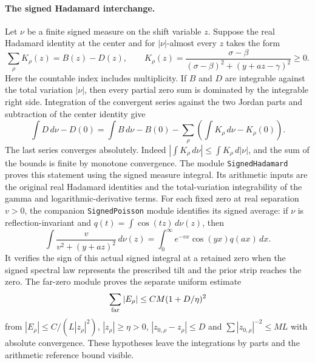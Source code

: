 \paragraph{The signed Hadamard interchange.}
Let $\nu$ be a finite signed measure on the shift variable $z$.
Suppose the real Hadamard identity at the center and for
$|\nu|$-almost every $z$ takes the form
\[
 \sum_{\rho}K_\rho(z)=B(z)-D(z),\qquad
 K_\rho(z)=\frac{\sigma-\beta}
 {(\sigma-\beta)^2+(y+az-\gamma)^2}\ge0.
\]
Here the countable index includes multiplicity. If $B$ and $D$ are
integrable against the total variation $|\nu|$, then every partial
zero sum is dominated by the integrable right side. Integration of
the convergent series against the two Jordan parts and subtraction
of the center identity give
\[
 \int D\,d\nu-D(0)
  = \int B\,d\nu-B(0)
      -\sum_\rho\left(\int K_\rho\,d\nu-K_\rho(0)\right).
\]
The last series converges absolutely. Indeed
$|\int K_\rho\,d\nu|\le\int K_\rho\,d|\nu|$, and the sum of the
bounds is finite by monotone convergence. The module
\texttt{SignedHadamard} proves this statement using the signed
measure integral. Its arithmetic inputs are the original real
Hadamard identities and the total-variation integrability of the
gamma and logarithmic-derivative terms.
For each fixed zero at real separation $v>0$, the companion
\texttt{SignedPoisson} module identifies its signed average:
if $\nu$ is reflection-invariant and
$q(t)=\int\cos(tz)\,d\nu(z)$, then
\[
 \int \frac{v}{v^2+(y+az)^2}\,d\nu(z)
  =\int_0^\infty e^{-vx}\cos(yx)q(ax)\,dx.
\]
It verifies the sign of this actual signed integral at a retained zero
when the signed spectral law represents the prescribed tilt and the
prior strip reaches the zero. The far-zero module proves the separate
uniform estimate
\[
 \sum_{\rm far}|E_\rho|\le CM(1+D/\eta)^2
\]
from $|E_\rho|\le C/(L|z_\rho|^2)$, $|z_\rho|\ge\eta>0$,
$|z_{0,\rho}-z_\rho|\le D$ and
$\sum|z_{0,\rho}|^{-2}\le ML$ with absolute convergence. These
hypotheses leave the integrations by parts and the arithmetic
reference bound visible.
